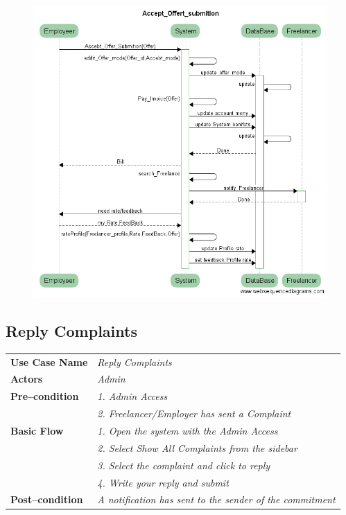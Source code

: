 \documentclass{article}
\begin{document}
\begin{figure}[ht!]
\centering
\includegraphics[width=128mm]{Accept_Offert_submition_usecase.png}
\end{figure}


\subsection{Reply Complaints}
    \begin{tabular}{ l | l }
    \toprule
      \rowcolor{LightCyan}
      \textbf{Use Case Name}    & \textit{Reply Complaints}\\
      \textbf{Actors}           & \textit{Admin}\\
      \rowcolor{LightCyan}
      \textbf{Pre--condition}   & \textit{1. Admin Access}\\
      \rowcolor{LightCyan}
                                & \textit{2. Freelancer/Employer has sent a Complaint}\\
      \textbf{Basic Flow}       & \textit{1. Open the system with the Admin Access}\\
                                & \textit{2. Select Show All Complaints from the sidebar}\\
                                & \textit{3. Select the complaint and click to reply}\\
                                & \textit{4. Write your reply and submit}\\
      \rowcolor{LightCyan}
      \textbf{Post--condition}  & \textit{A notification has sent to the sender of the commitment}\\
    \toprule
    \end{tabular}
\end{document}
